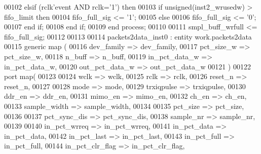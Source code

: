 \begin{DoxyCode}
00102    \textcolor{keywordflow}{elsif} \textcolor{vhdlchar}{(}\textcolor{vhdlchar}{rclk}\textcolor{vhdlchar}{'}\textcolor{vhdlkeyword}{event} \textcolor{keywordflow}{AND} \textcolor{vhdlchar}{rclk}\textcolor{vhdlchar}{=}\textcolor{vhdlchar}{'}\textcolor{vhdllogic}{}\textcolor{vhdllogic}{1}\textcolor{vhdlchar}{'}\textcolor{vhdlchar}{)} \textcolor{keywordflow}{then} 
00103       \textcolor{keywordflow}{if} \textcolor{comment}{unsigned}\textcolor{vhdlchar}{(}\textcolor{vhdlchar}{inst2_wrusedw}\textcolor{vhdlchar}{)} \textcolor{vhdlchar}{>} \textcolor{vhdlchar}{fifo_limit} \textcolor{keywordflow}{then}
00104          \textcolor{vhdlchar}{fifo_full_sig} \textcolor{vhdlchar}{<=} \textcolor{vhdlchar}{'}\textcolor{vhdllogic}{}\textcolor{vhdllogic}{1}\textcolor{vhdlchar}{'};
00105       \textcolor{keywordflow}{else}
00106          \textcolor{vhdlchar}{fifo_full_sig} \textcolor{vhdlchar}{<=} \textcolor{vhdlchar}{'}\textcolor{vhdllogic}{}\textcolor{vhdllogic}{0}\textcolor{vhdlchar}{'};
00107       \textcolor{keywordflow}{end} \textcolor{keywordflow}{if};
00108    \textcolor{keywordflow}{end} \textcolor{keywordflow}{if};
00109 \textcolor{keywordflow}{end} \textcolor{keywordflow}{process};
00110 
00111 \textcolor{vhdlchar}{smpl_buff_wrfull} \textcolor{vhdlchar}{<=} \textcolor{vhdlchar}{fifo_full_sig};
00112 
00113 
00114   packets2data\_inst0 : \textcolor{keywordflow}{entity} work.packets2data
00115    \textcolor{keywordflow}{generic} \textcolor{keywordflow}{map} (
00116       dev_family        => dev_family,
00117       pct_size_w        => pct_size_w,
00118       n_buff            => n_buff,
00119       in_pct_data_w     => in_pct_data_w,
00120       out_pct_data_w    => out_pct_data_w
00121    \textcolor{vhdlchar}{)}
00122    \textcolor{keywordflow}{port} \textcolor{keywordflow}{map}(
00123 
00124       wclk              => wclk,
00125       rclk              => rclk, 
00126       reset_n           => reset_n,
00127       
00128       mode              => mode,
00129       trxiqpulse        => trxiqpulse,  
00130       ddr_en              => ddr_en,
00131       mimo_en             => mimo_en,   
00132       ch_en               => ch_en,
00133       sample_width      => sample_width, 
00134      
00135       pct_size          => pct_size,
00136       
00137       pct_sync_dis      => pct_sync_dis,
00138       sample_nr         => sample_nr,
00139       
00140       in_pct_wrreq      => in_pct_wrreq,
00141       in_pct_data       => in_pct_data,
00142       in_pct_last       => in_pct_last,
00143       in_pct_full       => in_pct_full,
00144       in_pct_clr_flag   => in_pct_clr_flag,

\end{DoxyCode}
